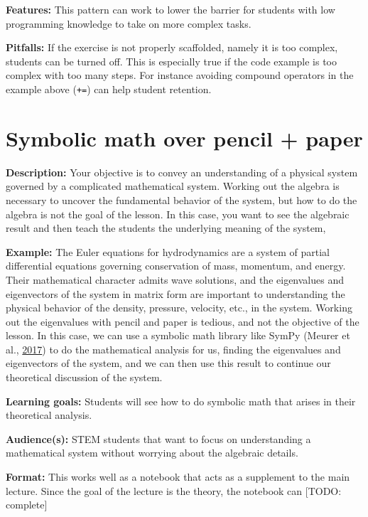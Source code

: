 \documentclass[]{book}
\begin{document}
\textbf{Features:} This pattern can work to lower the barrier for
students with low programming knowledge to take on more complex tasks.

\textbf{Pitfalls:} If the exercise is not properly scaffolded, namely it
is too complex, students can be turned off. This is especially true if
the code example is too complex with too many steps. For instance
avoiding compound operators in the example above (\texttt{+=}) can help
student retention.

\section{Symbolic math over pencil +
paper}\label{symbolic-math-over-pencil-paper}

\textbf{Description:} Your objective is to convey an understanding of a
physical system governed by a complicated mathematical system. Working
out the algebra is necessary to uncover the fundamental behavior of the
system, but how to do the algebra is not the goal of the lesson. In this
case, you want to see the algebraic result and then teach the students
the underlying meaning of the system,

\textbf{Example:} The Euler equations for hydrodynamics are a system of
partial differential equations governing conservation of mass, momentum,
and energy. Their mathematical character admits wave solutions, and the
eigenvalues and eigenvectors of the system in matrix form are important
to understanding the physical behavior of the density, pressure,
velocity, etc., in the system. Working out the eigenvalues with pencil
and paper is tedious, and not the objective of the lesson. In this case,
we can use a symbolic math library like SymPy (Meurer et al.,
\protect\hyperlink{ref-Meurer2017}{2017}) to do the mathematical
analysis for us, finding the eigenvalues and eigenvectors of the system,
and we can then use this result to continue our theoretical discussion
of the system.

\textbf{Learning goals:} Students will see how to do symbolic math that
arises in their theoretical analysis.

\textbf{Audience(s):} STEM students that want to focus on understanding
a mathematical system without worrying about the algebraic details.

\textbf{Format:} This works well as a notebook that acts as a supplement
to the main lecture. Since the goal of the lecture is the theory, the
notebook can {[}TODO: complete{]}
\end{document}
